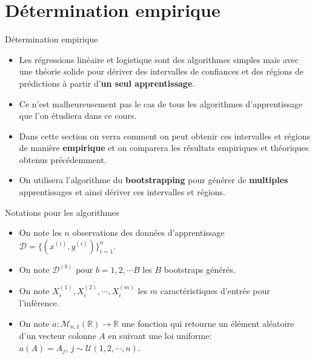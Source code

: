 \section[Détermination empirique]{Détermination empirique}

\begin{frame}{Détermination empirique}
	\begin{itemize}
		\item Les régressions linéaire et logistique sont des algorithmes simples mais avec une théorie solide pour dériver des intervalles de confiances et des régions de prédictions à partir d'\textbf{un seul apprentissage}.
		\pause
		\item Ce n'est malheureusement pas le cas de tous les algorithmes d'apprentissage que l'on étudiera dans ce cours.
		\pause
		\item Dans cette section on verra comment on peut obtenir ces intervalles et régions de manière \textbf{empirique} et on comparera les résultats empiriques et théoriques obtenus précédemment.
		\item On utilisera l'algorithme du \textbf{bootstrapping} pour générer de \textbf{multiples} apprentissages et ainsi dériver ces intervalles et régions.
	\end{itemize}
\end{frame}

\begin{frame}{Notations pour les algorithmes}
	\begin{itemize}
		\item On note les $n$ observations des données d'apprentissage $\mathcal{D} = \{(x^{(i)}, y^{(i)})\}_{i=1}^n$.
		\item On note $\mathcal{D}^{(b)} \text{  pour  } b=1, 2, \cdots B$ les $B$ bootstraps générés.
		\item On note ${X_i^{(1)}, X_i^{(2)}, \cdots, X_i^{(m)}}$ les $m$ caractéristiques d'entrée pour l'inférence.
		\item On note $a: \mathcal{M}_{n,1}(\mathbb{R}) \to \mathbb{R}$ une fonction qui retourne un élément aléatoire d'un vecteur colonne $A$ en suivant une loi uniforme: $a(A) = A_j, \, j \sim \mathcal{U}(1, 2, \cdots, n)$.
	\end{itemize}
\end{frame}

